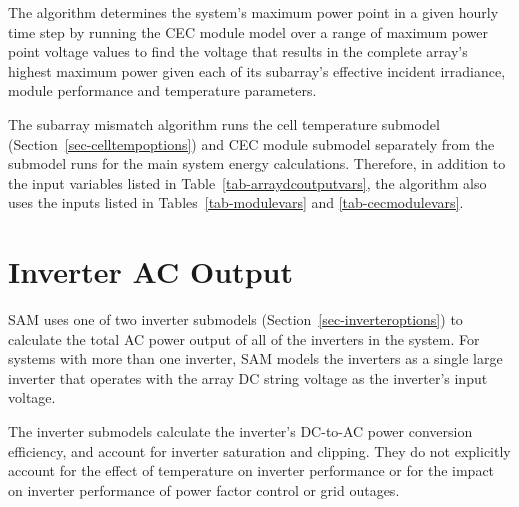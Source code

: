 \documentclass[12pt,letterpaper]{article}
\begin{document}
The algorithm determines the system's maximum power point in a given hourly time step by running the CEC module model over a range of maximum power point voltage values to find the voltage that results in the complete array's highest maximum power given each of its subarray's effective incident irradiance, module performance and temperature parameters.

The subarray mismatch algorithm runs the cell temperature submodel (Section~\ref{sec-celltempoptions}) and CEC module submodel separately from the submodel runs for the main system energy calculations. Therefore, in addition to the input variables listed in Table~\ref{tab-arraydcoutputvars}, the algorithm also uses the inputs listed in Tables~\ref{tab-modulevars} and \ref{tab-cecmodulevars}.

\chapter{Inverter AC Output}\label{sec-inverter}

SAM uses one of two inverter submodels (Section~\ref{sec-inverteroptions}) to calculate the total AC power output of all of the inverters in the system. For systems with more than one inverter, SAM models the inverters as a single large inverter that operates with the array DC string voltage as the inverter's input voltage. 

The inverter submodels calculate the inverter's DC-to-AC power conversion efficiency, and account for inverter saturation and clipping. They do not explicitly account for the effect of temperature on inverter performance or for the impact on inverter performance of power factor control or grid outages.
\end{document}
